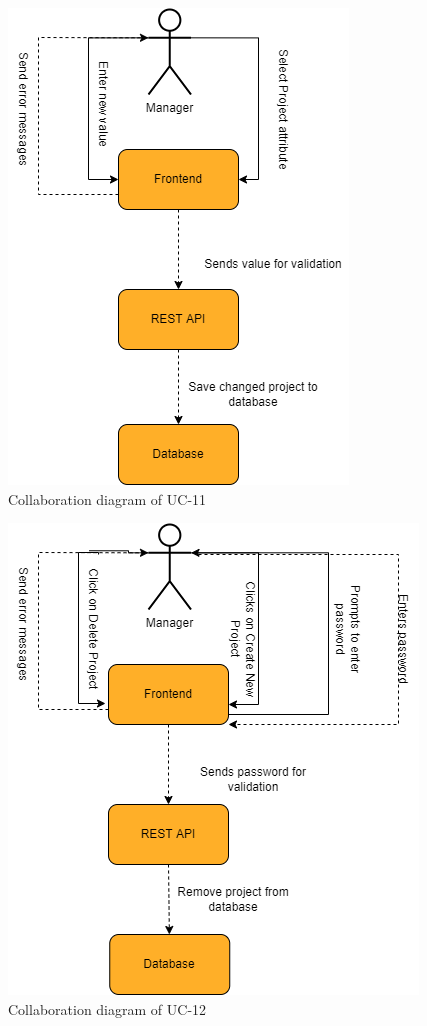 \begin{figure}[H]
    \centering
    \includegraphics[scale=0.5]{./diagrams/collaboration/cd-11.png}
    \caption{Collaboration diagram of UC-11}
    \label{fig:cd-11}
    
\end{figure}


\begin{figure}[H]
    \centering
    \includegraphics[scale=0.5]{./diagrams/collaboration/cd-12.png}
    \caption{Collaboration diagram of UC-12}
    \label{fig:cd-12}
    
\end{figure}


